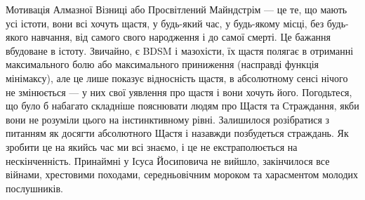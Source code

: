 Мотивація Алмазної Візниці або Просвітлений Майндстрім ---
це те, що мають усі істоти, вони всі хочуть щастя,
у будь-який час, у будь-якому місці, без будь-якого
навчання, від самого свого народження і до самої смерті. Це бажання вбудоване в істоту. Звичайно, є BDSM і мазохісти, їх щастя полягає
в отриманні максимального болю або максимального
приниження (насправді функція мінімаксу), але це
лише показує відносність щастя, в абсолютному
сенсі нічого не змінюється --- у них свої уявлення
про щастя і вони хочуть його. Погодьтеся, що було б
набагато складніше пояснювати людям про Щастя
та Страждання, якби вони не розуміли цього на
інстинктивному рівні. Залишилося розібратися
з питанням як досягти абсолютного Щастя і назавжди
позбудеться страждань. Як зробити це на якийсь
час ми всі знаємо, і це не екстраполюється на
нескінченність. Принаймні у Ісуса Йосиповича
не вийшло, закінчилося все війнами, хрестовими
походами, середньовічним мороком та харасментом молодих послушників.
